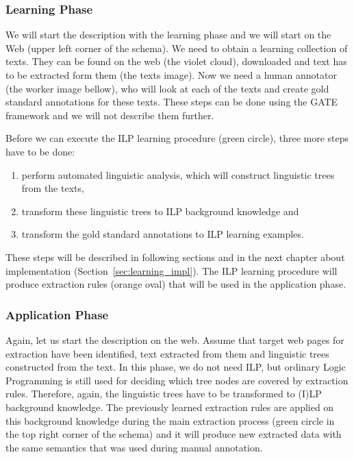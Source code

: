 \subsubsection{Learning Phase}
We will start the description with the learning phase and we will start on the Web (upper left corner of the schema). We need to obtain a learning collection of texts. They can be found on the web (the violet cloud), downloaded and text has to be extracted form them (the texts image). Now we need a human annotator (the worker image bellow), who will look at each of the texts and create gold standard annotations for these texts. These steps can be done using the GATE framework and we will not describe them further. 

Before we can execute the ILP learning procedure (green circle), three more steps have to be done:
\begin{enumerate}
	\item perform automated linguistic analysis, which will construct linguistic trees from the texts,
	\item transform these linguistic trees to ILP background knowledge and
	\item transform the gold standard annotations to ILP learning examples.
\end{enumerate}
These steps will be described in following sections and in the next chapter about implementation (Section~\ref{sec:learning_impl}). The ILP learning procedure will produce extraction rules (orange oval) that will be used in the application phase.

\subsubsection{Application Phase}
Again, let us start the description on the web. Assume that target web pages for extraction have been identified, text extracted from them and linguistic trees constructed from the text. In this phase, we do not need ILP, but ordinary Logic Programming is still used for deciding which tree nodes are covered by extraction rules. Therefore, again, the linguistic trees have to be transformed to (I)LP background knowledge.
 The previously learned extraction rules are applied on this background knowledge during the main extraction process (green circle in the top right corner of the schema) and it will produce new extracted data with the same semantics that was used during manual annotation.

